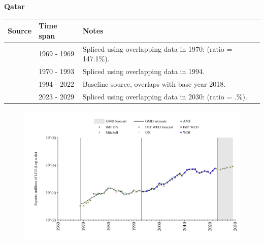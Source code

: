 \documentclass[12pt,a4paper,landscape]{article}
\begin{document}
\begin{adjustbox}{max totalsize={\paperwidth}{\paperheight},center}
\begin{minipage}[t][\textheight][t]{\textwidth}
\vspace*{0.5cm}
{}
\begin{center}
{\Large\bfseries Qatar}
\end{center}
\vspace{0.5cm}
\begin{table}[H]
\centering
\small
\begin{tabular}{|l|l|l|}
\hline
\textbf{Source} & \textbf{Time span} & \textbf{Notes} \\
\hline
\rowcolor{white}\cite{Mitchell}& 1969 - 1969 &Spliced using overlapping data in 1970: (ratio = 147.1\%).\\
\rowcolor{lightgray}\cite{UN}& 1970 - 1993 &Spliced using overlapping data in 1994.\\
\rowcolor{white}\cite{WDI}& 1994 - 2022 &Baseline source, overlaps with base year 2018.\\
\rowcolor{lightgray}\cite{IMF_WEO_forecast}& 2023 - 2029 &Spliced using overlapping data in 2030: (ratio = .\%).\\
\hline
\end{tabular}
\end{table}
\begin{figure}[H]
\centering
\includegraphics[width=\textwidth,height=0.6\textheight,keepaspectratio]{graphs/QAT_exports.pdf}
\end{figure}
\end{minipage}
\end{adjustbox}
\end{document}
